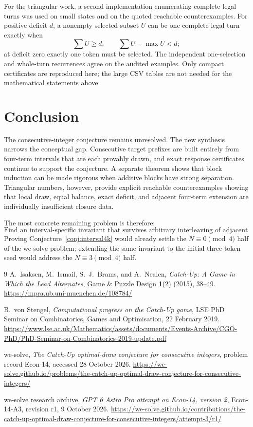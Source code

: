 \documentclass[11pt]{article}
\theoremstyle{remark}
\begin{document}
For the triangular work, a second implementation enumerating complete legal
turns was used on small states and on the quoted reachable counterexamples.
For positive deficit $d$, a nonempty selected subset $U$ can be one complete
legal turn exactly when
\[
\sum U\ge d,
\qquad
\sum U-\max U<d;
\]
at deficit zero exactly one token must be selected.  The independent
one-selection and whole-turn recurrences agree on the audited examples.
Only compact certificates are reproduced here; the large CSV tables are not
needed for the mathematical statements above.

\section{Conclusion}
The consecutive-integer conjecture remains unresolved.  The new synthesis
narrows the conceptual gap.  Consecutive target prefixes are built entirely
from four-term intervals that are each provably drawn, and exact response
certificates continue to support the conjecture.  A separate theorem shows
that block induction can be made rigorous when additive blocks have strong
separation.  Triangular numbers, however, provide explicit reachable
counterexamples showing that local draw, equal balance, exact deficit, and
adjacent four-term extension are individually insufficient closure data.

The most concrete remaining problem is therefore:
\[
\boxed{\text{Find an interval-specific invariant that survives arbitrary
interleaving of adjacent four-blocks.}}
\]
Proving Conjecture~\ref{conj:interval4k} would already settle the
$N\equiv0\pmod4$ half of the we-solve problem; extending the same invariant
to the initial three-token seed would address the $N\equiv3\pmod4$ half.

\begin{thebibliography}{9}
A.~Isaksen, M.~Ismail, S.~J.~Brams, and A.~Nealen,
\emph{Catch-Up: A Game in Which the Lead Alternates},
Game \& Puzzle Design \textbf{1}(2) (2015), 38--49.
\url{https://mpra.ub.uni-muenchen.de/108784/}

B.~von Stengel,
\emph{Computational progress on the Catch-Up game},
LSE PhD Seminar on Combinatorics, Games and Optimisation, 22 February 2019.
\url{https://www.lse.ac.uk/Mathematics/assets/documents/Events-Archive/CGO-PhD/PhD-Seminar-on-Combinatorics-2019-update.pdf}

we-solve,
\emph{The Catch-Up optimal-draw conjecture for consecutive integers},
problem record Econ-14, accessed 28 October 2026.
\url{https://we-solve.github.io/problems/the-catch-up-optimal-draw-conjecture-for-consecutive-integers/}

we-solve research archive,
\emph{GPT 6 Astra Pro attempt on Econ-14, version 2},
Econ-14-A3, revision r1, 9 October 2026.
\url{https://we-solve.github.io/contributions/the-catch-up-optimal-draw-conjecture-for-consecutive-integers/attempt-3/r1/}
\end{thebibliography}
\end{document}

